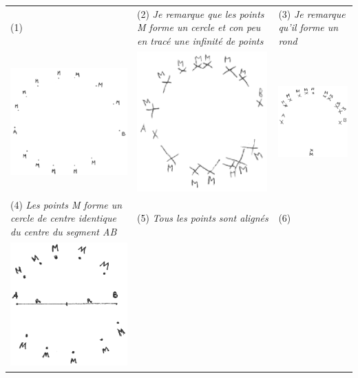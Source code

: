 \begin{exercice}
\begin{tabular}{|p{5.5cm}|p{5.5cm}|p{5.5cm}|}
   \hline
   (1)
   &
   (2) {\small\it Je remarque que les points M forme un cercle et con peu en tracé une infinité de points}
   &
   (3) {\small\it Je remarque qu'il forme un rond} \\
   \includegraphics[width=5cm]{Geometrie_did/Images/Geo5_analyse_cercle_T1}
   &
   \includegraphics[width=5cm]{Geometrie_did/Images/Geo5_analyse_cercle_T2} 
   & \includegraphics[width=5cm]{Geometrie_did/Images/Geo5_analyse_cercle_T3} \\
   \hline
   (4) {\small\it Les points M forme un cercle de centre identique du centre du segment AB}
   &
   (5) {\small\it Tous les points sont alignés}
   &
   (6) \\
   \includegraphics[width=5cm]{Geometrie_did/Images/Geo5_analyse_cercle_T4}   

\end{tabular}
\end{exercice}
